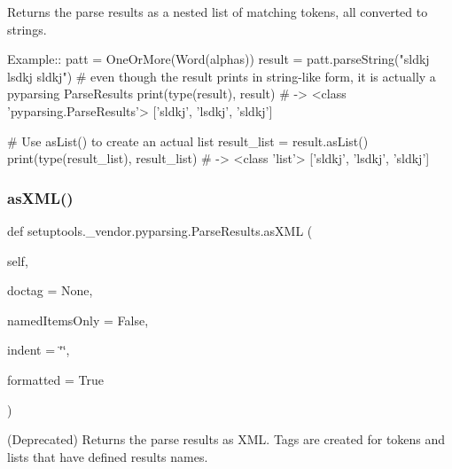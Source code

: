 \begin{DoxyVerb}Returns the parse results as a nested list of matching tokens, all converted to strings.

Example::
    patt = OneOrMore(Word(alphas))
    result = patt.parseString("sldkj lsdkj sldkj")
    # even though the result prints in string-like form, it is actually a pyparsing ParseResults
    print(type(result), result) # -> <class 'pyparsing.ParseResults'> ['sldkj', 'lsdkj', 'sldkj']
    
    # Use asList() to create an actual list
    result_list = result.asList()
    print(type(result_list), result_list) # -> <class 'list'> ['sldkj', 'lsdkj', 'sldkj']
\end{DoxyVerb}
 \mbox{\label{classsetuptools_1_1__vendor_1_1pyparsing_1_1ParseResults_a1ef3733e1f8c5c2ad4a759b9c01809a9}} 
\subsubsection{\texorpdfstring{as\+X\+M\+L()}{asXML()}}
{\footnotesize\ttfamily def setuptools.\+\_\+vendor.\+pyparsing.\+Parse\+Results.\+as\+X\+ML (\begin{DoxyParamCaption}\item[{}]{self,  }\item[{}]{doctag = {\ttfamily None},  }\item[{}]{named\+Items\+Only = {\ttfamily False},  }\item[{}]{indent = {\ttfamily \char`\"{}\char`\"{}},  }\item[{}]{formatted = {\ttfamily True} }\end{DoxyParamCaption})}

\begin{DoxyVerb}(Deprecated) Returns the parse results as XML. Tags are created for tokens and lists that have defined results names.
\end{DoxyVerb}
 \mbox{\label{classsetuptools_1_1__vendor_1_1pyparsing_1_1ParseResults_a2683a26b96b087edaec172f6f837058b}} 
